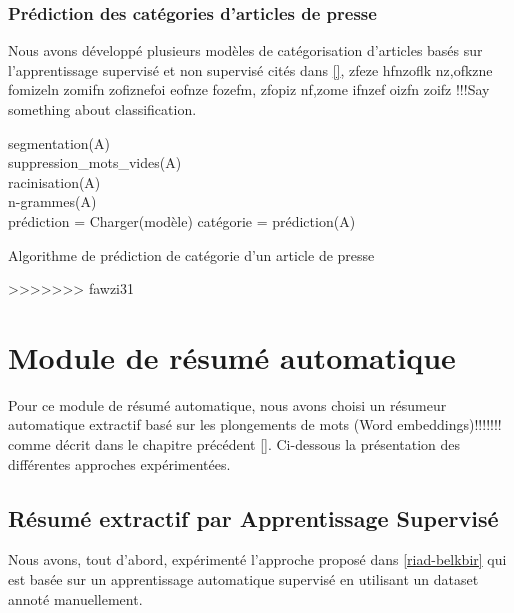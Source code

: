         \subsubsection{Prédiction des catégories d'articles de presse}
            Nous avons développé plusieurs modèles de catégorisation d'articles basés sur l'apprentissage supervisé et non supervisé cités dans \autoref{},  zfeze hfnzoflk nz,ofkzne fomizeln zomifn zofiznefoi eofnze fozefm, zfopiz nf,zome ifnzef oizfn zoifz !!!Say something about classification.
            
            \begin{algorithm2e}[H]
            \SetAlgoLined
            segmentation(A)\\
            suppression\_mots\_vides(A)\\
            racinisation(A)\\
            n-grammes(A)\\
            prédiction = Charger(modèle)
            catégorie = prédiction(A)
            \caption{Algorithme de prédiction de catégorie d'un article de presse}
            \end{algorithm2e}



>>>>>>> fawzi31
\section{Module de résumé automatique}
Pour ce module de résumé automatique, nous avons choisi un résumeur automatique extractif \cite{notreresume} basé sur les plongements de mots (Word embeddings)!!!!!!! comme décrit dans le chapitre précédent \autoref{}.
Ci-dessous la présentation des différentes approches expérimentées.
    \subsection{Résumé extractif par Apprentissage Supervisé}
    Nous avons, tout d'abord, expérimenté l'approche proposé dans \ref{riad-belkbir} qui est basée sur un apprentissage automatique supervisé en utilisant un dataset annoté manuellement. 
